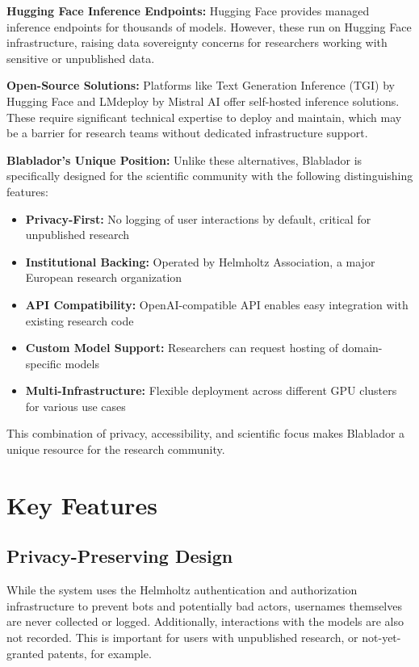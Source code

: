 \documentclass[10pt,conference]{IEEEtran}
\begin{document}
\textbf{Hugging Face Inference Endpoints:} Hugging Face provides managed inference endpoints for thousands of models. However, these run on Hugging Face infrastructure, raising data sovereignty concerns for researchers working with sensitive or unpublished data.

\textbf{Open-Source Solutions:} Platforms like Text Generation Inference (TGI) by Hugging Face and LMdeploy by Mistral AI offer self-hosted inference solutions. These require significant technical expertise to deploy and maintain, which may be a barrier for research teams without dedicated infrastructure support.

\textbf{Blablador's Unique Position:} Unlike these alternatives, Blablador is specifically designed for the scientific community with the following distinguishing features:

\begin{itemize}
    \item \textbf{Privacy-First:} No logging of user interactions by default, critical for unpublished research
    \item \textbf{Institutional Backing:} Operated by Helmholtz Association, a major European research organization
    \item \textbf{API Compatibility:} OpenAI-compatible API enables easy integration with existing research code
    \item \textbf{Custom Model Support:} Researchers can request hosting of domain-specific models
    \item \textbf{Multi-Infrastructure:} Flexible deployment across different GPU clusters for various use cases
\end{itemize}

This combination of privacy, accessibility, and scientific focus makes Blablador a unique resource for the research community.

\section{Key Features}
\subsection{Privacy-Preserving Design}
While the system uses the Helmholtz authentication and authorization infrastructure to prevent bots and potentially bad actors, usernames themselves are never collected or logged. Additionally, interactions with the models are also not recorded.
This is important for users with unpublished research, or not-yet-granted patents, for example.
\end{document}
